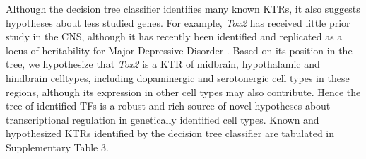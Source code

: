 Although the decision tree classifier identifies many known KTRs, it also suggests hypotheses about less studied genes. For example, \textit{Tox2} has received little prior study in the CNS, although it has recently been identified and replicated as a locus of heritability for Major Depressive Disorder \citep{Zeng_2016}. Based on its position in the tree, we hypothesize that \textit{Tox2} is a KTR of midbrain, hypothalamic and hindbrain celltypes, including dopaminergic and serotonergic cell types in these regions, although its expression in other cell types may also contribute. Hence the tree of identified TFs is a robust and rich source of novel hypotheses about transcriptional regulation in genetically identified cell types. Known and hypothesized KTRs identified by the decision tree classifier are tabulated in Supplementary Table 3.

